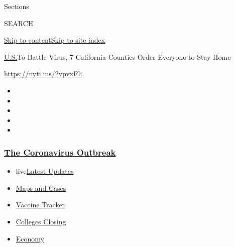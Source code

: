 Sections

SEARCH

\protect\hyperlink{site-content}{Skip to
content}\protect\hyperlink{site-index}{Skip to site index}

\href{/section/us}{U.S.}\textbar{}To Battle Virus, 7 California Counties
Order Everyone to Stay Home

\url{https://nyti.ms/2vpvxFh}

\begin{itemize}
\item
\item
\item
\item
\item
\end{itemize}

\hypertarget{the-coronavirus-outbreak}{%
\subsubsection{\texorpdfstring{\href{https://www.nytimes3xbfgragh.onion/news-event/coronavirus?name=styln-coronavirus-national\&region=TOP_BANNER\&variant=undefined\&block=storyline_menu_recirc\&action=click\&pgtype=Article\&impression_id=0907ca80-e3b6-11ea-b8d7-679efbc46ecc}{The
Coronavirus
Outbreak}}{The Coronavirus Outbreak}}\label{the-coronavirus-outbreak}}

\begin{itemize}
\tightlist
\item
  live\href{https://www.nytimes3xbfgragh.onion/2020/08/21/world/covid-19-coronavirus.html?name=styln-coronavirus-national\&region=TOP_BANNER\&variant=undefined\&block=storyline_menu_recirc\&action=click\&pgtype=Article\&impression_id=0907f190-e3b6-11ea-b8d7-679efbc46ecc}{Latest
  Updates}
\item
  \href{https://www.nytimes3xbfgragh.onion/interactive/2020/us/coronavirus-us-cases.html?name=styln-coronavirus-national\&region=TOP_BANNER\&variant=undefined\&block=storyline_menu_recirc\&action=click\&pgtype=Article\&impression_id=0907f191-e3b6-11ea-b8d7-679efbc46ecc}{Maps
  and Cases}
\item
  \href{https://www.nytimes3xbfgragh.onion/interactive/2020/science/coronavirus-vaccine-tracker.html?name=styln-coronavirus-national\&region=TOP_BANNER\&variant=undefined\&block=storyline_menu_recirc\&action=click\&pgtype=Article\&impression_id=0907f192-e3b6-11ea-b8d7-679efbc46ecc}{Vaccine
  Tracker}
\item
  \href{https://www.nytimes3xbfgragh.onion/2020/08/19/us/colleges-closing-covid.html?name=styln-coronavirus-national\&region=TOP_BANNER\&variant=undefined\&block=storyline_menu_recirc\&action=click\&pgtype=Article\&impression_id=0907f193-e3b6-11ea-b8d7-679efbc46ecc}{Colleges
  Closing}
\item
  \href{https://www.nytimes3xbfgragh.onion/live/2020/08/21/business/stock-market-today-coronavirus?name=styln-coronavirus-national\&region=TOP_BANNER\&variant=undefined\&block=storyline_menu_recirc\&action=click\&pgtype=Article\&impression_id=0907f194-e3b6-11ea-b8d7-679efbc46ecc}{Economy}
\end{itemize}

